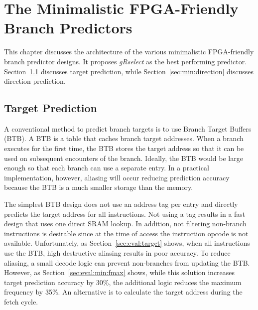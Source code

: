 \chapter{The Minimalistic FPGA-Friendly Branch Predictors}
\label{chap:minimal}
This chapter discusses the architecture of the various minimalistic FPGA-friendly branch predictor designs. It proposes \textit{gRselect} as the best performing predictor. Section~\ref{sec:min:target} discusses target prediction, while Section~\ref{sec:min:direction} discusses direction prediction.

\section{Target Prediction}
\label{sec:min:target}
A conventional method to predict branch targets is to use Branch Target Buffers (BTB). A BTB is a table that caches branch target addresses. When a branch executes for the first time, the BTB stores the target address so that it can be used on subsequent encounters of the branch. Ideally, the BTB would be large enough so that each branch can use a separate entry. In a practical implementation, however, aliasing will occur reducing prediction accuracy because the BTB is a much smaller storage than the memory.

The simplest BTB design does not use an address tag per entry and directly predicts the target address for all instructions. Not using a tag results in a fast design that uses one direct SRAM lookup. In addition, not filtering non-branch instructions is desirable since at the time of access the instruction opcode is not available. Unfortunately, as Section~\ref{sec:eval:target} shows, when all instructions use the BTB, high destructive aliasing results in poor accuracy. To reduce aliasing, a small decode logic can prevent non-branches from updating the BTB. However, as Section~\ref{sec:eval:min:fmax} shows, while this solution increases target prediction accuracy by 30\%, the additional logic reduces the maximum frequency by 35\%. An alternative is to calculate the target address during the fetch cycle.


